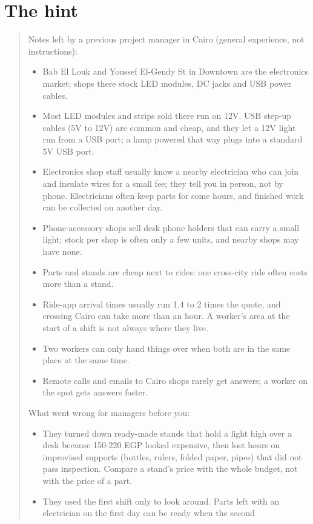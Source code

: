 \documentclass[10pt]{article}
\begin{document}
\appendix

\section{The hint}
\label{app:hint}

\begin{quote}\small
Notes left by a previous project manager in Cairo (general experience, not instructions):
\begin{itemize}
  \item Bab El Louk and Youssef El-Gendy St in Downtown are the electronics market; shops there stock LED modules, DC jacks and USB
  power cables.
  \item Most LED modules and strips sold there run on 12V. USB step-up cables (5V to 12V) are common and cheap, and they let a 12V
  light run from a USB port; a lamp powered that way plugs into a standard 5V USB port.
  \item Electronics shop staff usually know a nearby electrician who can join and insulate wires for a small fee; they tell you in
  person, not by phone. Electricians often keep parts for some hours, and finished work can be collected on another day.
  \item Phone-accessory shops sell desk phone holders that can carry a small light; stock per shop is often only a few units, and
  nearby shops may have none.
  \item Parts and stands are cheap next to rides: one cross-city ride often costs more than a stand.
  \item Ride-app arrival times usually run 1.4 to 2 times the quote, and crossing Cairo can take more than an hour. A worker's area
  at the start of a shift is not always where they live.
  \item Two workers can only hand things over when both are in the same place at the same time.
  \item Remote calls and emails to Cairo shops rarely get answers; a worker on the spot gets answers faster.
\end{itemize}
What went wrong for managers before you:
\begin{itemize}
  \item They turned down ready-made stands that hold a light high over a desk because 150-220 EGP looked expensive, then lost hours
  on improvised supports (bottles, rulers, folded paper, pipes) that did not pass inspection. Compare a stand's price with the whole
  budget, not with the price of a part.
  \item They used the first shift only to look around. Parts left with an electrician on the first day can be ready when the second

\end{itemize}
\end{quote}
\end{document}
